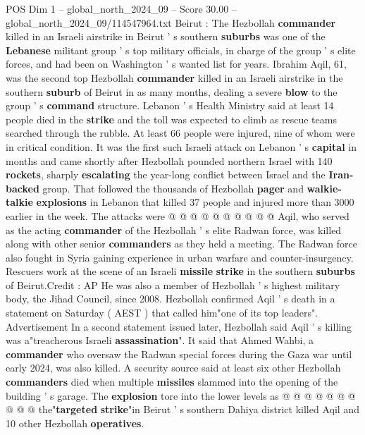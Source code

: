 \begin{textsample}{POS Dim 1 – global\_north\_2024\_09 – Score 30.00 – global\_north\_2024\_09/114547964.txt}  \label{ex:f1_pos_095}
Beirut : The Hezbollah \textbf{commander} killed in an Israeli airstrike in Beirut ' s southern \textbf{suburbs} was one of the \textbf{Lebanese} militant group ' s top military officials, in charge of the group ' s elite forces, and had been on Washington ' s wanted list for years.
Ibrahim Aqil, 61, was the second top Hezbollah \textbf{commander} killed in an Israeli airstrike in the southern \textbf{suburb} of Beirut in as many months, dealing a severe \textbf{blow} to the group ' s \textbf{command} structure.
Lebanon ' s Health Ministry said at least 14 people died in the \textbf{strike} and the toll was expected to climb as rescue teams searched through the rubble.
At least 66 people were injured, nine of whom were in critical condition.
It was the first such Israeli attack on Lebanon ' s \textbf{capital} in months and came shortly after Hezbollah pounded northern Israel with 140 \textbf{rockets}, sharply \textbf{escalating} the year-long conflict between Israel and the \textbf{Iran-backed} group.
That followed the thousands of Hezbollah \textbf{pager} and \textbf{walkie-talkie} \textbf{explosions} in Lebanon that killed 37 people and injured more than 3000 earlier in the week.
The attacks were @ @ @ @ @ @ @ @ @ @ Aqil, who served as the acting \textbf{commander} of the Hezbollah ' s elite Radwan force, was killed along with other senior \textbf{commanders} as they held a meeting.
The Radwan force also fought in Syria gaining experience in urban warfare and counter-insurgency.
Rescuers work at the scene of an Israeli \textbf{missile} \textbf{strike} in the southern \textbf{suburbs} of Beirut.Credit : AP He was also a member of Hezbollah ' s highest military body, the Jihad Council, since 2008.
Hezbollah confirmed Aqil ' s death in a statement on Saturday ( AEST ) that called him"one of its top leaders".
Advertisement In a second statement issued later, Hezbollah said Aqil ' s killing was a"treacherous Israeli \textbf{assassination}".
It said that Ahmed Wahbi, a \textbf{commander} who oversaw the Radwan special forces during the Gaza war until early 2024, was also killed.
A security source said at least six other Hezbollah \textbf{commanders} died when multiple \textbf{missiles} slammed into the opening of the building ' s garage.
The \textbf{explosion} tore into the lower levels as @ @ @ @ @ @ @ @ @ @ the"\textbf{targeted} \textbf{strike}"in Beirut ' s southern Dahiya district killed Aqil and 10 other Hezbollah \textbf{operatives}.

\end{textsample}
